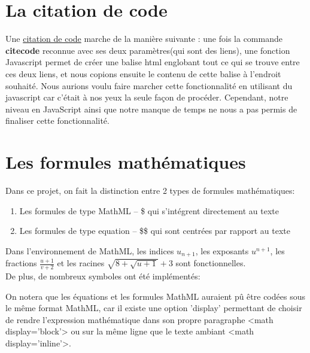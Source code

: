 \documentclass[10pt,a4paper]{report}
\begin{document}
\section{La citation de code}

Une \underline{citation de code} marche de la manière suivante : une fois la commande {\bf citecode} reconnue avec ses deux paramètres(qui sont des liens), une fonction Javascript permet de créer une balise html englobant tout ce qui se trouve entre ces deux liens, et nous copions ensuite le contenu de cette balise à l'endroit souhaité. Nous aurions voulu faire marcher cette fonctionnalité en utilisant du javascript car c'était à nos yeux la seule façon de procéder. Cependant, notre niveau en JavaScript ainsi que notre manque de temps ne nous a pas permis de finaliser cette fonctionnalité.

\section{Les formules mathématiques}

Dans ce projet, on fait la distinction entre 2 types de formules mathématiques:
\begin{enumerate}
\item Les formules de type MathML -- \$ qui s'intégrent directement au texte
\item Les formules de type equation -- \$\$ qui sont centrées par rapport au texte
\end{enumerate}

Dans l'environnement de MathML, les indices $u_{n+1}$, les exposants $u^{n+1}$, les fractions $\frac{u+1}{v+2}$ et les racines $\sqrt{8+\sqrt{u+1}} +3$ sont fonctionnelles.
\\De plus, de nombreux symboles ont été implémentés:


On notera que les équations et les formules MathML auraient pû être codées sous le même format MathML, car il existe une option 'display' permettant de choisir de rendre l'expression mathématique dans son propre paragraphe <math display='block'> ou sur la même ligne que le texte ambiant <math display='inline'>.
\end{document}
